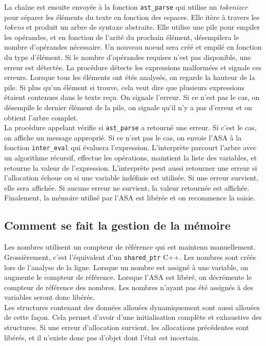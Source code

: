 \documentclass[a4paper,12pt,french]{article}
\begin{document}
		La chaîne est ensuite envoyée à la fonction \lstinline$ast_parse$ qui utilise un \textit{tokenizer} pour séparer les éléments du texte en fonction des espaces. Elle itère à travers les \textit{tokens} et produit un arbre de syntaxe abstraite. Elle utilise une pile pour empiler les opérandes, et en fonction
		de l'arité du prochain élément, désempilera le nombre d'opérandes nécessaire. Un nouveau
		noeud sera créé et empilé en fonction du type d'élément. Si le nombre d'opérandes requises
		n'est pas disponible, une erreur est détectée. La procédure détecte les expressions malformées
		et signale ces erreurs. Lorsque tous les éléments ont étés analysés, on regarde la hauteur de
		la pile. Si plus qu'un élément si trouve, cela veut dire que plusieurs expressions étaient
		contenues dans le texte reçu. On signale l'erreur. Si ce n'est pas le cas, on désempile le dernier
		élément de la pile, on signale qu'il n'y a pas d'erreur et on obtient l'arbre complet.\\

		La procédure appelant vérifie si \lstinline$ast_parse$ a retourné une erreur. Si c'est le cas, on affiche
		un message approprié. Si ce n'est pas le cas, on envoie l'ASA à la fonction \lstinline$inter_eval$ qui évaluera l'expression. L'interprète parcourt l'arbre avec un algorithme récursif, effectue les opérations,
		maintient la liste des variables, et retourne la valeur de l'expression. L'interprète peut aussi
		retourner une erreur si l'allocation échoue ou si une variable indéfinie est utilisée. Si une erreur
		survient, elle sera affichée. Si aucune erreur ne survient, la valeur retournée est affichée.
		Finalement, la mémoire utilisé par l'ASA est libérée et on recommence la saisie.\\

		\subsection{Comment se fait la gestion de la mémoire}
		Les nombres utilisent un compteur de référence qui est maintenu manuellement. Grossièrement,
		c'est l'équivalent d'un \lstinline$shared_ptr$ C++. Les nombres sont créés lors de l'analyse de la
		ligne. Lorsque un nombre est assigné à une variable, on augmente le compteur de
		référence. Lorsque l'ASA est libéré, on décrémente le compteur de référence des nombres.
		Les nombres n'ayant pas été assignés à des variables seront donc libérés.\\

		Les structures contenant des données allouées dynamiquement sont aussi allouées de cette
		façon. Cela permet d'avoir d'une initialisation complète et exhaustive des structures.
		Si une erreur d'allocation survient, les allocations précédentes sont libérés, et il
		n'existe donc pas d'objet dont l'état est incertain.\\
\end{document}
